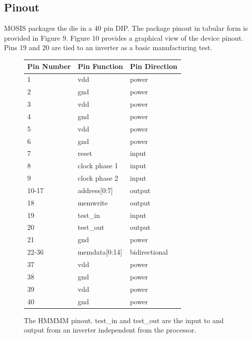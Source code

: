 \documentclass[12pt]{article}
\begin{document}
\subsection{Pinout}

MOSIS packages the die in a 40 pin DIP. The package pinout in tabular form is provided in Figure 9. Figure 10 provides a graphical view of the device pinout. Pins 19 and 20 are tied to an inverter as a basic manufacturing test.

\begin{figure}[H]
    \begin{center}
    \begin{tabular}{lll}
        Pin Number & Pin Function & Pin Direction \\
        \hline
        1 & vdd & power \\
        2 & gnd & power \\
        3 & vdd & power \\
        4 & gnd & power \\
        5 & vdd & power \\
        6 & gnd & power \\
        7 & reset & input \\
        8 & clock phase 1 & input \\
        9 & clock phase 2 & input \\
        10-17 & address[0:7] & output \\
        18 & memwrite & output \\
        19 & test\_in & input \\
        20 & test\_out & output \\
        21 & gnd & power \\
        22-36 & memdata[0:14] & bidirectional \\
        37 & vdd & power \\
        38 & gnd & power \\
        39 & vdd & power \\
        40 & gnd & power
    \end{tabular}
    \caption{The HMMMM pinout. test\_in and test\_out are the input to and output from an inverter independent from the processor.}
    \end{center}
    \label{fig:pinout}
\end{figure}
\end{document}
